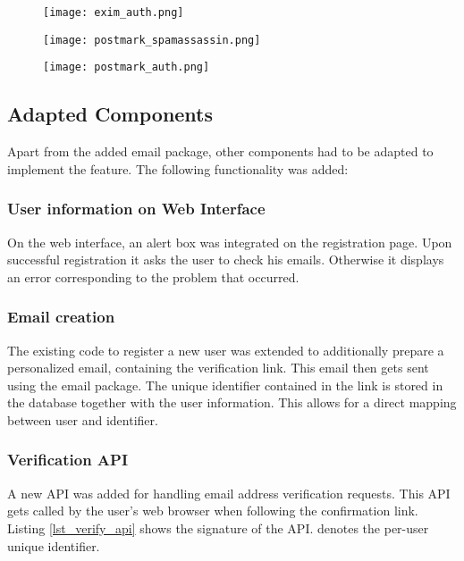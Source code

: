 \begin{figure}
	\centering
	\texttt{[image: exim\_auth.png]}
	\label{exim_auth}
\end{figure}

\begin{figure}
	\centering
	\texttt{[image: postmark\_spamassassin.png]}
	\label{postmark_spam}
\end{figure}

\begin{figure}
	\centering
	\texttt{[image: postmark\_auth.png]}
	\label{postmark_auth}
\end{figure}

\subsection{Adapted Components}

Apart from the added email package, other components had to be adapted to implement the feature. The following functionality was added:

\subsubsection{User information on Web Interface}
On the web interface, an alert box was integrated on the registration page. Upon successful registration it asks the user to check his emails. Otherwise it displays an error corresponding to the problem that occurred.

\subsubsection{Email creation}
The existing code to register a new user was extended to additionally prepare a personalized email, containing the verification link. This email then gets sent using the email package. The unique identifier contained in the link is stored in the database together with the user information. This allows for a direct mapping between user and identifier.

\subsubsection{Verification API}
A new API was added for handling email address verification requests. This API gets called by the user's web browser when following the confirmation link. Listing \ref{lst_verify_api} shows the signature of the API.  denotes the per-user unique identifier.

